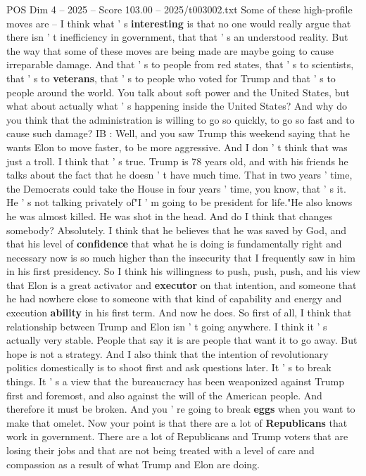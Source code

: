 \begin{textsample}{POS Dim 4 – 2025 – Score 103.00 – 2025/t003002.txt}
Some of these high-profile moves are -- I think what ' s \textbf{interesting} is that no one would really argue that there isn ' t inefficiency in government, that that ' s an understood reality.
But the way that some of these moves are being made are maybe going to cause irreparable damage.
And that ' s to people from red states, that ' s to scientists, that ' s to \textbf{veterans}, that ' s to people who voted for Trump and that ' s to people around the world.
You talk about soft power and the United States, but what about actually what ' s happening inside the United States?
And why do you think that the administration is willing to go so quickly, to go so fast and to cause such damage?
IB : Well, and you saw Trump this weekend saying that he wants Elon to move faster, to be more aggressive.
And I don ' t think that was just a troll.
I think that ' s true.
Trump is 78 years old, and with his friends he talks about the fact that he doesn ' t have much time.
That in two years ' time, the Democrats could take the House in four years ' time, you know, that ' s it.
He ' s not talking privately of"I ' m going to be president for life."He also knows he was almost killed.
He was shot in the head.
And do I think that changes somebody?
Absolutely.
I think that he believes that he was saved by God, and that his level of \textbf{confidence} that what he is doing is fundamentally right and necessary now is so much higher than the insecurity that I frequently saw in him in his first presidency.
So I think his willingness to push, push, push, and his view that Elon is a great activator and \textbf{executor} on that intention, and someone that he had nowhere close to someone with that kind of capability and energy and execution \textbf{ability} in his first term.
And now he does.
So first of all, I think that relationship between Trump and Elon isn ' t going anywhere.
I think it ' s actually very stable.
People that say it is are people that want it to go away.
But hope is not a strategy.
And I also think that the intention of revolutionary politics domestically is to shoot first and ask questions later.
It ' s to break things.
It ' s a view that the bureaucracy has been weaponized against Trump first and foremost, and also against the will of the American people.
And therefore it must be broken.
And you ' re going to break \textbf{eggs} when you want to make that omelet.
Now your point is that there are a lot of \textbf{Republicans} that work in government.
There are a lot of Republicans and Trump voters that are losing their jobs and that are not being treated with a level of care and compassion as a result of what Trump and Elon are doing.

\end{textsample}
